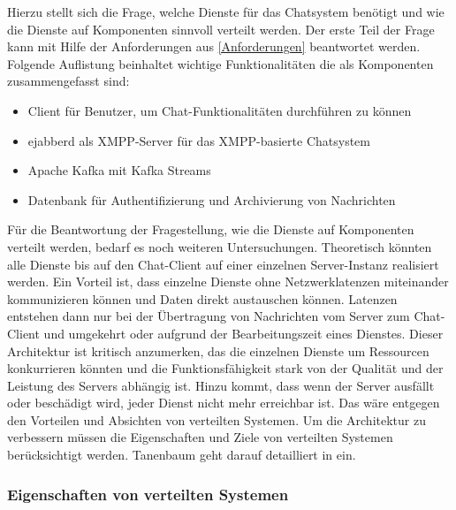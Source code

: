 \documentclass[a4paper,titlepage,halfparskip,12pt]{scrreprt}
\begin{document}
\begin{onehalfspacing}
Hierzu stellt sich die Frage, welche Dienste für das Chatsystem benötigt und wie die Dienste auf Komponenten sinnvoll verteilt werden. Der erste Teil der Frage kann mit Hilfe der Anforderungen aus \autoref{Anforderungen} beantwortet werden. Folgende Auflistung beinhaltet wichtige Funktionalitäten die als Komponenten zusammengefasst sind:

\begin{itemize}
\item Client für Benutzer, um Chat-Funktionalitäten durchführen zu können
\item ejabberd als \ac{XMPP}-Server für das \ac{XMPP}-basierte Chatsystem
\item Apache Kafka mit Kafka Streams
\item Datenbank für Authentifizierung und Archivierung von Nachrichten
\end{itemize}

\newpage

Für die Beantwortung der Fragestellung, wie die Dienste auf Komponenten verteilt werden, bedarf es noch weiteren Untersuchungen. Theoretisch könnten alle Dienste bis auf den Chat-Client auf einer einzelnen Server-Instanz realisiert werden. Ein Vorteil ist, dass einzelne Dienste ohne Netzwerklatenzen miteinander kommunizieren können und Daten direkt austauschen können. Latenzen entstehen dann nur bei der Übertragung von Nachrichten vom Server zum Chat-Client und umgekehrt oder aufgrund der Bearbeitungszeit eines Dienstes. Dieser Architektur ist kritisch anzumerken, das die einzelnen Dienste um Ressourcen konkurrieren könnten und die Funktionsfähigkeit stark von der Qualität und der Leistung des Servers abhängig ist. Hinzu kommt, dass wenn der Server ausfällt oder beschädigt wird, jeder Dienst nicht mehr erreichbar ist. Das wäre entgegen den Vorteilen und Absichten von verteilten Systemen. Um die Architektur zu verbessern müssen die Eigenschaften und Ziele von verteilten Systemen berücksichtigt werden. Tanenbaum geht darauf detailliert in \cite{andrew2008verteilte} ein.

\subsubsection*{Eigenschaften von verteilten Systemen}


\end{onehalfspacing}
\end{document}
